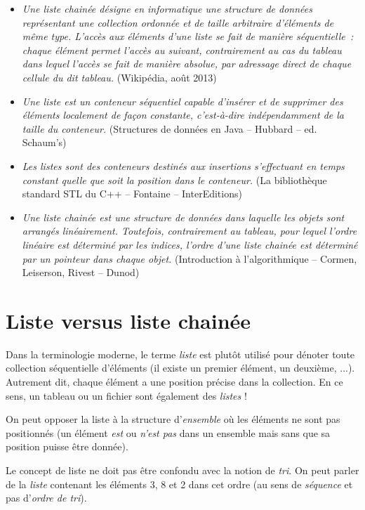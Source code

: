 	\begin{itemize}
		\item 
			\textit{Une liste chainée désigne en informatique une structure de données
			représentant une collection ordonnée et de taille arbitraire d'éléments 
			de même type. L'accès aux éléments d'une liste se fait de manière 
			séquentielle~: chaque élément permet l'accès au suivant, 
			contrairement au cas du tableau dans lequel l'accès se fait de
			manière absolue, par adressage direct de chaque cellule 
			du dit tableau.} 
			(Wikipédia, août 2013)
		\item
			\textit{Une liste est un conteneur séquentiel capable d'insérer 
			et de supprimer des éléments localement de façon constante, 
			c'est-à-dire indépendamment de la taille du conteneur.} 
			(Structures de données en Java -- Hubbard -- ed. Schaum's)
	\item
		\textit{Les listes sont des conteneurs destinés aux insertions 
		s'effectuant en temps constant quelle que soit la position 
		dans le conteneur.} 
		(La bibliothèque standard STL du C++ -- Fontaine -- InterEditions)
	\item
		\textit{Une liste chainée est une structure de données dans 
		laquelle les objets sont arrangés linéairement. Toutefois,
		contrairement au tableau, pour lequel l'ordre linéaire est 
		déterminé par les indices, l'ordre d'une liste chainée est
		déterminé par un pointeur dans chaque objet.} 
		(Introduction à l'algorithmique -- Cormen, Leiserson, Rivest -- Dunod)
\end{itemize}


\section{Liste versus liste chainée}

	Dans la terminologie moderne, le terme \textit{liste} est 
	plutôt utilisé pour dénoter toute collection séquentielle
	d'éléments (il existe un premier élément, un deuxième, ...). 
	Autrement dit, chaque élément a une position précise dans
	la collection. En ce sens, un tableau ou un fichier sont 
	également des \textit{listes} !
	
	On peut opposer la liste à la structure d'\textit{ensemble} 
	où les éléments ne sont pas positionnés (un élément
	\textit{est} ou \textit{n'est pas} dans un ensemble mais 
	sans que sa position puisse être donnée).
	
	Le concept de liste ne doit pas être confondu avec la notion 
	de \textit{tri}. On peut parler de la \textit{liste}
	contenant les éléments 3, 8 et 2 dans cet ordre 
	(au sens de \textit{séquence} et pas d'\textit{ordre de tri}).


